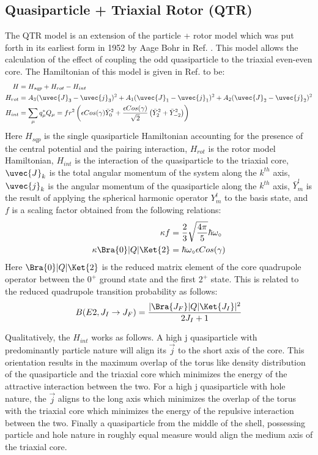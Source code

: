 \subsection{Quasiparticle + Triaxial Rotor (QTR)}
\label{sec:models-qtr}
The QTR model is an extension of the particle + rotor model which was put forth in its earliest form in 1952 by Aage Bohr in Ref. \cite{bohrParticlePlusRotor}. This model allows the calculation of the effect of coupling the odd quasiparticle to the triaxial even-even core. The Hamiltonian of this model is given in Ref. \cite{frauendorfTransverseWobbling} to be:
\begin{align}
\label{eqn:chp2-qtr-hamil}
H&=H_{sqp}+H_{rot}-H_{int}\\
H_{rot}&=A_3(\uvec{J}_3-\uvec{j}_3)^2+A_1(\uvec{J}_1-\uvec{j}_1)^2+A_2(\uvec{J}_2-\uvec{j}_2)^2\\
H_{int}&= \sum\limits_{\mu}^{}q^*_{\mu}Q_{\mu} = f r^2 \left(\epsilon Cos(\gamma) \bar{Y}^2_0 + \frac{\epsilon Cos(\gamma)}{\sqrt{2}}\left(\bar{Y}^2_2 + \bar{Y}^2_{-2}\right)\right)
\end{align}
Here $H_{sqp}$ is the single quasiparticle Hamiltonian accounting for the presence of the central potential and the pairing interaction, $H_{rot}$ is the rotor model Hamiltonian, $H_{int}$ is the interaction of the quasiparticle to the triaxial core, $\uvec{J}_k$ is the total angular momentum of the system along the $k^{th}$ axis, $\uvec{j}_k$ is the angular momentum of the quasiparticle along the $k^{th}$ axis, $\bar{Y}^l_m$ is the result of applying the spherical harmonic operator $Y^l_m$ to the basis state, and $f$ is a scaling factor obtained from the following relations:
\begin{align}
\label{eqn:chp2-qtr-int-hamil-scaling}
\kappa f &= \frac{2}{3}\sqrt{\frac{4\pi}{5}}\hbar\omega_{\circ}\\
\kappa \Bra{0}|Q|\Ket{2} & = \hbar\omega_{\circ} \epsilon Cos(\gamma)
\end{align}
Here $\Bra{0}|Q|\Ket{2}$ is the reduced matrix element of the core quadrupole operator between the  $0^+$ ground state and the first $2^+$ state. This is related to the reduced quadrupole transition probability as follows:
\begin{equation}
\label{eqn:chp2-red-mat-el-to-red-trans-prob}
B(E2,J_I\rightarrow{}J_F)=\frac{|\Bra{J_F}|Q|\Ket{J_I}|^2}{2J_I+1}
\end{equation}

Qualitatively, the $H_{int}$ works as follows. A high j quasiparticle with predominantly particle nature will align its $\vec{j}$ to the short axis of the core. This orientation results in the maximum overlap of the torus like density distribution of the quasiparticle and the triaxial core which minimizes the energy of the attractive interaction between the two. For a high j quasiparticle with hole nature, the $\vec{j}$ aligns to the long axis which minimizes the overlap of the torus with the triaxial core which minimizes the energy of the repulsive interaction between the two. Finally a quasiparticle from the middle of the shell, possessing particle and hole nature in roughly equal measure would align the medium axis of the triaxial core.

